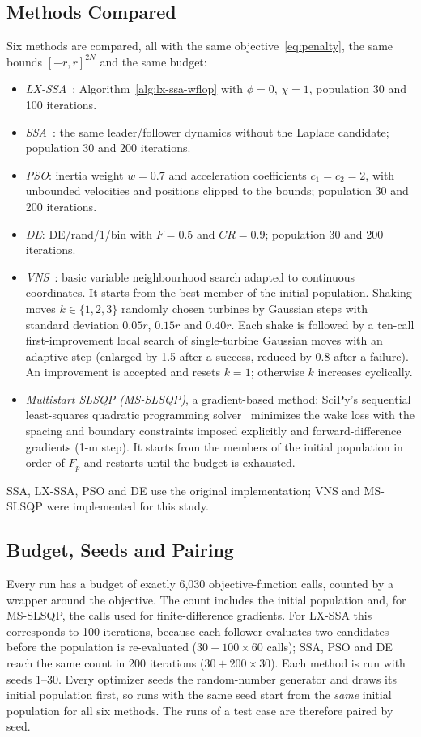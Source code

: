 \subsection{Methods Compared}
Six methods are compared, all with the same objective~\eqref{eq:penalty}, the same bounds $[-r,r]^{2N}$ and the same budget:
\begin{itemize}
\item \emph{LX-SSA}~\cite{Solanki2023}: Algorithm~\ref{alg:lx-ssa-wflop} with $\phi=0$, $\chi=1$, population 30 and 100 iterations.
\item \emph{SSA}~\cite{Mirjalili2017}: the same leader/follower dynamics without the Laplace candidate; population 30 and 200 iterations.
\item \emph{PSO}: inertia weight $w=0.7$ and acceleration coefficients $c_1=c_2=2$, with unbounded velocities and positions clipped to the bounds; population 30 and 200 iterations.
\item \emph{DE}: DE/rand/1/bin with $F=0.5$ and $CR=0.9$; population 30 and 200 iterations.
\item \emph{VNS}~\cite{Mladenovic1997,Cazzaro2022}: basic variable neighbourhood search adapted to continuous coordinates. It starts from the best member of the initial population. Shaking moves $k\in\{1,2,3\}$ randomly chosen turbines by Gaussian steps with standard deviation $0.05r$, $0.15r$ and $0.40r$. Each shake is followed by a ten-call first-improvement local search of single-turbine Gaussian moves with an adaptive step (enlarged by 1.5 after a success, reduced by 0.8 after a failure). An improvement is accepted and resets $k=1$; otherwise $k$ increases cyclically.
\item \emph{Multistart SLSQP (MS-SLSQP)}, a gradient-based method: SciPy's sequential least-squares quadratic programming solver~\cite{Kraft1988} minimizes the wake loss with the spacing and boundary constraints imposed explicitly and forward-difference gradients (1-m step). It starts from the members of the initial population in order of $F_p$ and restarts until the budget is exhausted.
\end{itemize}
SSA, LX-SSA, PSO and DE use the original implementation; VNS and MS-SLSQP were implemented for this study.

\subsection{Budget, Seeds and Pairing}
Every run has a budget of exactly 6,030 objective-function calls, counted by a wrapper around the objective. The count includes the initial population and, for MS-SLSQP, the calls used for finite-difference gradients. For LX-SSA this corresponds to 100 iterations, because each follower evaluates two candidates before the population is re-evaluated ($30+100\times60$ calls); SSA, PSO and DE reach the same count in 200 iterations ($30+200\times30$). Each method is run with seeds 1--30. Every optimizer seeds the random-number generator and draws its initial population first, so runs with the same seed start from the \emph{same} initial population for all six methods. The runs of a test case are therefore paired by seed.

